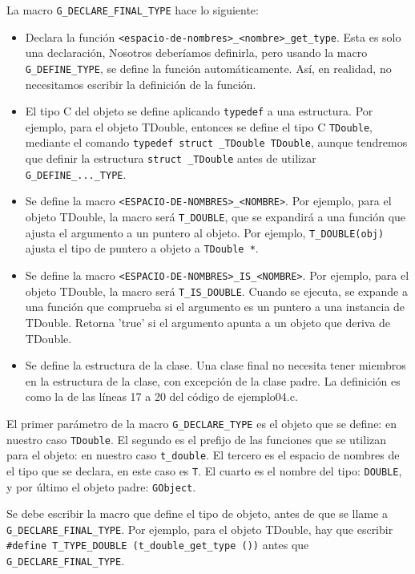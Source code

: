 La macro \texttt{G\_DECLARE\_FINAL\_TYPE} hace lo siguiente:
\begin{itemize}
  \tightlist
\item Declara la función \texttt{<espacio-de-nombres>\_<nombre>\_get\_type}. Esta es solo una declaración,
  Nosotros deberíamos definirla, pero usando la macro \texttt{G\_DEFINE\_TYPE}, se define la función
  automáticamente. Así, en realidad, no necesitamos escribir la definición de la función.
\item El tipo C del objeto se define aplicando \texttt{typedef} a una estructura. Por ejemplo, para el objeto
  \textsf{TDouble}, entonces se define el tipo C \texttt{TDouble}, mediante el comando
  \texttt{typedef struct \_TDouble TDouble}, aunque tendremos que definir la estructura \texttt{struct \_TDouble}
  antes de utilizar \texttt{G\_DEFINE\_...\_TYPE}.
\item Se define la macro \texttt{<ESPACIO-DE-NOMBRES>\_<NOMBRE>}. Por ejemplo, para el objeto
  \textsf{TDouble}, la macro será \texttt{T\_DOUBLE}, que se expandirá a una función que ajusta el argumento
  a un puntero al objeto. Por ejemplo, \texttt{T\_DOUBLE(obj)} ajusta el tipo de puntero a objeto a
  \texttt{TDouble *}.
\item Se define la macro \texttt{<ESPACIO-DE-NOMBRES>\_IS\_<NOMBRE>}. Por ejemplo, para el objeto
  \textsf{TDouble}, la macro será \texttt{T\_IS\_DOUBLE}. Cuando se ejecuta, se expande a una función que
  comprueba si el argumento es un puntero a una instancia de \textsf{TDouble}. Retorna 'true' si el argumento
  apunta a un objeto que deriva de \textsf{TDouble}.
\item Se define la estructura de la clase. Una clase final no necesita tener miembros en la estructura de la clase,
  con excepción de la clase padre. La definición es como la de las líneas 17 a 20 del código de  ejemplo04.c.
\end{itemize}

El primer parámetro de la macro \texttt{G\_DECLARE\_TYPE} es el objeto que se define: en nuestro
caso \texttt{TDouble}. El segundo es el prefijo de las funciones que se utilizan para el objeto: en nuestro
caso \texttt{t\_double}. El tercero es el espacio de nombres de el tipo que se declara, en este caso es
\texttt{T}. El cuarto es el nombre del tipo: \texttt{DOUBLE}, y por último el objeto padre: \texttt{GObject}.

Se debe escribir la macro que define el tipo de objeto, antes de que se llame a
\texttt{G\_DECLARE\_FINAL\_TYPE}. Por ejemplo, para el objeto \textsf{TDouble}, hay que escribir
\texttt{\#define T\_TYPE\_DOUBLE (t\_double\_get\_type ())} antes que \texttt{G\_DECLARE\_FINAL\_TYPE}.

